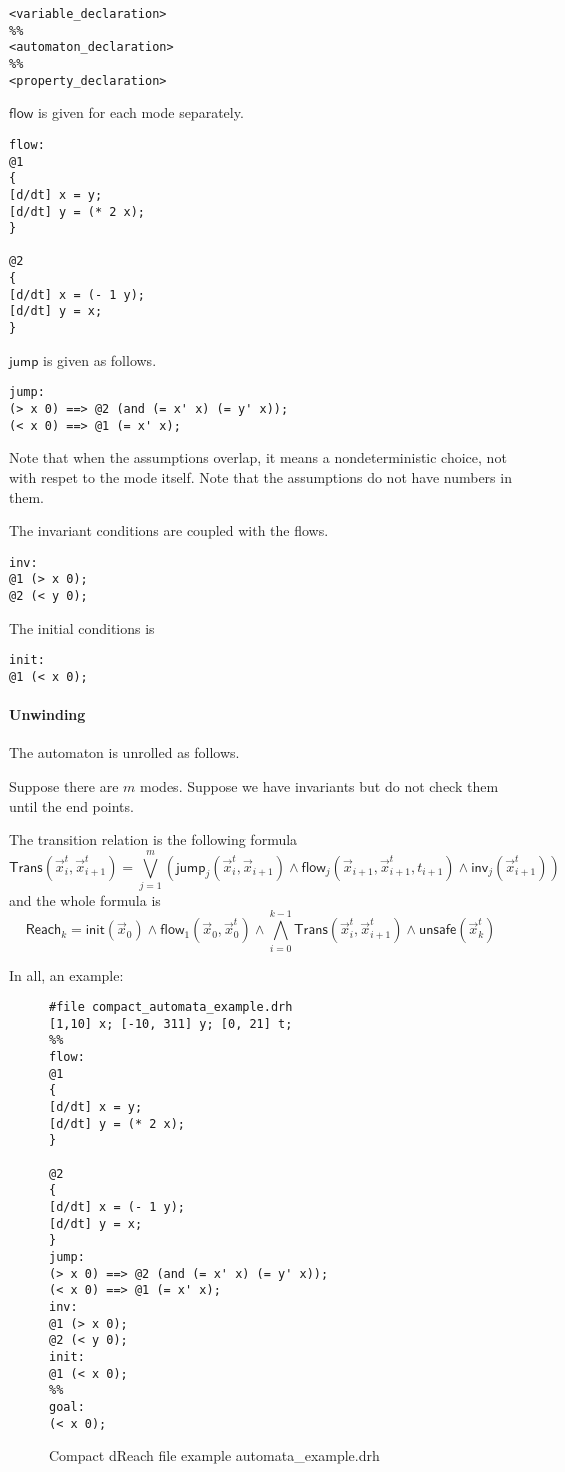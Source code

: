 \documentclass[envcountsect]{llncs}
\newcommand{\flow}{\mathsf{flow}}
\newcommand{\jump}{\mathsf{jump}}
\newcommand{\inv}{\mathsf{inv}}
\newcommand{\init}{\mathsf{init}}
\newcommand{\reach}{\mathsf{Reach}}
\newcommand{\unsafe}{\mathsf{unsafe}}
\begin{document}
\begin{verbatim}
<variable_declaration>
%%
<automaton_declaration>
%%
<property_declaration>
\end{verbatim}
$\flow$ is given for each mode separately. 
\begin{verbatim}
flow:
@1
{
[d/dt] x = y;
[d/dt] y = (* 2 x);
}

@2
{
[d/dt] x = (- 1 y);
[d/dt] y = x;
}
\end{verbatim}
$\jump$ is given as follows.
\begin{verbatim}
jump:
(> x 0) ==> @2 (and (= x' x) (= y' x));
(< x 0) ==> @1 (= x' x);
\end{verbatim}
Note that when the assumptions overlap, it means a nondeterministic choice, not
with respet to the mode itself. Note that the assumptions do not have numbers
in them. 

The invariant conditions are coupled with the flows. 
\begin{verbatim}
inv:
@1 (> x 0);
@2 (< y 0);
\end{verbatim}
The initial conditions is
\begin{verbatim}
init:
@1 (< x 0);
\end{verbatim}


\paragraph{Unwinding} The automaton is unrolled as follows. 

Suppose there are $m$ modes. Suppose we have invariants but do not check them
until the end points. 

The transition relation is the following formula
$$\mathsf{Trans}(\vec x_i^t, \vec x_{i+1}^t) = \bigvee_{j=1}^m (\jump_j(\vec
x_i^t, \vec x_{i+1}) \wedge \flow_j(\vec x_{i+1}, \vec x_{i+1}^t, t_{i+1})
\wedge \inv_j(\vec x_{i+1}^t))$$
and the whole formula is
$$\reach_{k} = \init(\vec x_0)\wedge \flow_1(\vec x_0, \vec x_0^t)\wedge 
\bigwedge_{i=0}^{k-1} \mathsf{Trans}(\vec x_i^t, \vec x_{i+1}^t)\wedge
\unsafe(\vec x_{k}^t)$$

In all, an example:
\begin{figure}[h!]
\label{dreach}
\begin{verbatim}
#file compact_automata_example.drh
[1,10] x; [-10, 311] y; [0, 21] t;
%%
flow:
@1
{
[d/dt] x = y;
[d/dt] y = (* 2 x);
}

@2
{
[d/dt] x = (- 1 y);
[d/dt] y = x;
}
jump:
(> x 0) ==> @2 (and (= x' x) (= y' x));
(< x 0) ==> @1 (= x' x);
inv:
@1 (> x 0);
@2 (< y 0);
init:
@1 (< x 0);
%%
goal:
(< x 0);
\end{verbatim}
\caption{Compact dReach file example automata\_example.drh}
\end{figure}
\end{document}
